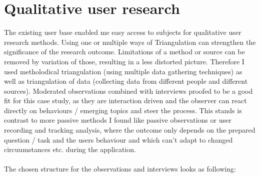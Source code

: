 \section{Qualitative user research}

The existing user base enabled me easy access to subjects for qualitative user research methods.
Using one or multiple ways of Triangulation \cite[p. 264]{Interactiondesign:2019ys} can strengthen the significance of the research outcome. Limitations of a method or source can be removed by variation of those, resulting in a less distorted picture.
Therefore I used metholodical triangulation (using multiple data gathering techniques) as well as triangulation of data (collecting data from different people and different sources).
Moderated observations combined with interviews proofed to be a good fit for this case study, as they are interaction driven and the observer can react directly on behaviours / emerging topics and steer the process.
This stands is contrast to more passive methods I found like passive observations or user recording and tracking analysis, where the outcome only depends on the
prepared question / task and the users behaviour and which can't adapt to changed circuumstances etc. during the application.
\\\\
The chosen structure for the observations and interviews looks as following:

